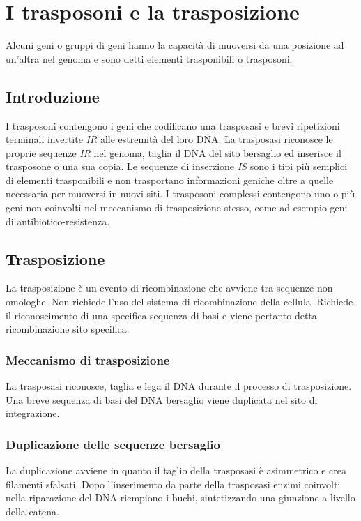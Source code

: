 \section{I trasposoni e la trasposizione}
	
Alcuni geni o gruppi di geni hanno la capacità di muoversi da una posizione ad un'altra nel genoma e sono detti elementi trasponibili o trasposoni. 

	\subsection{Introduzione}
	I trasposoni contengono i geni che codificano una trasposasi e brevi ripetizioni terminali invertite \emph{IR} alle estremità del loro DNA. 
	La trasposasi riconosce le proprie sequenze \emph{IR} nel genoma, taglia il DNA del sito bersaglio ed inserisce il trasposone o una sua copia. 
	Le sequenze di inserzione \emph{IS}  sono i tipi più semplici di elementi trasponibili e non trasportano informazioni geniche oltre a quelle necessaria per muoversi in nuovi siti.
	I trasposoni complessi contengono uno o più geni non coinvolti nel meccanismo di trasposizione stesso, come ad esempio geni di antibiotico-resistenza.

	\subsection{Trasposizione}
	La trasposizione è un evento di ricombinazione che avviene tra sequenze non omologhe.
	Non richiede l'uso del sistema di ricombinazione della cellula. 
	Richiede il riconoscimento di una specifica sequenza di basi e viene pertanto detta ricombinazione sito specifica.
	
		\subsubsection{Meccanismo di trasposizione}
		La trasposasi riconosce, taglia e lega il DNA durante il processo di trasposizione. 
		Una breve sequenza di basi del DNA bersaglio viene duplicata nel sito di integrazione. 

		\subsubsection{Duplicazione delle sequenze bersaglio}
		La duplicazione avviene in quanto il taglio della trasposasi \`e asimmetrico e crea filamenti sfalsati.
		Dopo l'inserimento da parte della trasposasi enzimi coinvolti nella riparazione del DNA riempiono i buchi, sintetizzando una giunzione a livello della catena.


